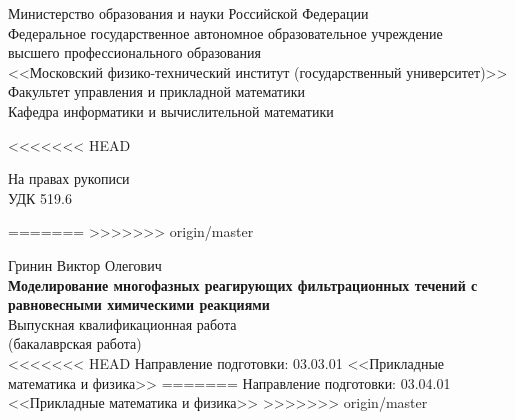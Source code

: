 \documentclass[14pt,a4paper]{extarticle}
\begin{document}
\thispagestyle{empty}


\begin{center}
	Министерство образования и науки Российской Федерации\\[6pt]
	
	Федеральное государственное автономное образовательное учреждение\\
	высшего профессионального образования\\
	<<Московский физико-технический институт (государственный университет)>>\\[6pt]
	
	Факультет управления и прикладной математики\\[6pt]
	Кафедра информатики и вычислительной математики\\[6pt]	
\end{center} 
\vspace{20mm}
<<<<<<< HEAD
\begin{flushright}
На правах рукописи\\
УДК 519.6
\end{flushright}

=======
>>>>>>> origin/master
\begin{center}
	Гринин Виктор Олегович\\[6pt]
	
	{\large {\bf Моделирование многофазных реагирующих фильтрационных течений с равновесными химическими реакциями}}\\[6pt]
	
	Выпускная квалификационная работа\\
	(бакалаврская работа)\\
	
<<<<<<< HEAD
	Направление подготовки: 03.03.01 <<Прикладные математика и физика>>
=======
	Направление подготовки: 03.04.01 <<Прикладные математика и физика>>
>>>>>>> origin/master
\end{center}

\vspace{20mm}
\end{document}
